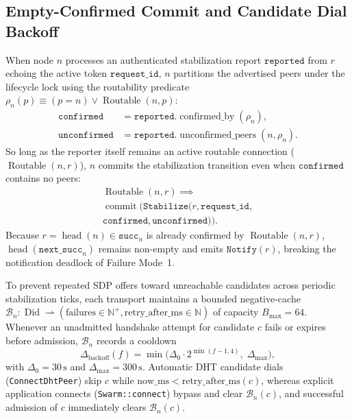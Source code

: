 \documentclass[journal]{IEEEtran}
\newcommand{\Head}{\operatorname{head}}
\begin{document}
\subsection{Empty-Confirmed Commit and Candidate Dial Backoff}
When node $n$ processes an authenticated stabilization report $\texttt{reported}$
from $r$ echoing the active token $\texttt{request\_id}$, $n$ partitions the
advertised peers under the lifecycle lock using the routability predicate
$\rho_n(p) \equiv (p = n) \lor \operatorname{Routable}(n, p)$:
\begin{align}
  \texttt{confirmed}   &= \texttt{reported}.\operatorname{confirmed\_by}(\rho_n), \\
  \texttt{unconfirmed} &= \texttt{reported}.\operatorname{unconfirmed\_peers}(n, \rho_n).
\end{align}
So long as the reporter itself remains an active routable connection
($\operatorname{Routable}(n, r)$), $n$ commits the stabilization transition even
when $\texttt{confirmed}$ contains no peers:
\begin{multline}
  \operatorname{Routable}(n, r) \implies\\
  \operatorname{commit}\bigl(\texttt{Stabilize}(r, \texttt{request\_id},\\
  \texttt{confirmed}, \texttt{unconfirmed})\bigr).
  \label{eq:empty-confirmed-commit}
\end{multline}
Because $r = \Head(n) \in \texttt{succ}_n$ is already confirmed by
$\operatorname{Routable}(n, r)$, $\Head(\texttt{next\_succ}_n)$ remains
non-empty and emits $\texttt{Notify}(r)$, breaking the notification deadlock of
Failure Mode~1.

To prevent repeated SDP offers toward unreachable candidates across periodic
stabilization ticks, each transport maintains a bounded negative-cache
$\mathcal{B}_n : \operatorname{Did} \rightharpoonup (\text{failures} \in
\mathbb{N}^+, \text{retry\_after\_ms} \in \mathbb{N})$ of capacity $B_{\max} =
64$. Whenever an unadmitted handshake attempt for candidate $c$ fails or expires
before admission, $\mathcal{B}_n$ records a cooldown
\begin{equation}
  \Delta_{\text{backoff}}(f) = \min\bigl(\Delta_0 \cdot 2^{\min(f-1, 4)},\;
  \Delta_{\max}\bigr),
\end{equation}
with $\Delta_0 = 30\,\text{s}$ and $\Delta_{\max} = 300\,\text{s}$. Automatic
DHT candidate dials (\texttt{ConnectDhtPeer}) skip $c$ while
$\text{now\_ms} < \text{retry\_after\_ms}(c)$, whereas explicit application
connects (\texttt{Swarm::connect}) bypass and clear $\mathcal{B}_n(c)$, and
successful admission of $c$ immediately clears $\mathcal{B}_n(c)$.
\end{document}
